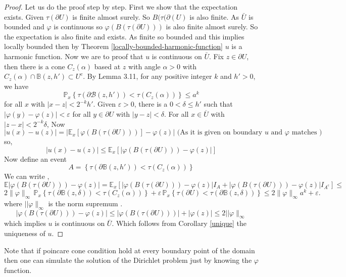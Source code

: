 \documentclass{article}
\numberwithin{equation}{section}
\begin{document}
\begin{proof}
Let us do the proof step by step. First we show that the expectation exists.
Given \(\tau(\partial U)\) is finite almost surely. So \(B(\tau(\partial(U)\) is also finite. As \(\bar{U}\) is bounded and \(\varphi\) is continuous so \(\varphi(B(\tau(\partial U)))\) is also finite almost surely. So the expectation is also finite and exists.
\noindent As finite so bounded and this implies locally bounded then by Theorem \ref{locally-bounded-harmonic-function} \(u\) is a harmonic function.
\noindent Now we are to proof that \(u\) is continuous on \(\bar{U}\). Fix \( z \in \partial U \), then there is a cone \( C_z(\alpha) \)
based at \( z \) with angle \( \alpha > 0 \) with \( C_z(\alpha) \cap \mathbb{B}(z, h') \subset U^c \). By Lemma 3.11, 
for any positive integer \( k \) and \( h' > 0 \), we have
\[
\mathbb{P}_x \left\{ \tau(\partial \mathcal{B}(z, h')) < \tau(C_z(\alpha)) \right\} \leq a^k
\]
for all \( x \) with \( |x - z| < 2^{-k} h' \). Given \( \varepsilon > 0 \), there is a \( 0 < \delta \leq h' \) such that 
\( |\varphi(y) - \varphi(z)| < \varepsilon \) for all \( y \in \partial U \) with \( |y - z| < \delta \). 
For all \( x \in \overline{U} \) with \( |z - x| < 2^{-k} \delta \),
Now \[
|u(x)-u(z)| = | \mathbb{E}_x[\varphi(B(\tau(\partial U)))]-\varphi(z)|
\text{ (As it is given on boundary \(u\) and \(\varphi\) matches )} 
\]
so,
\[
|u(x)-u(z)| \leq \mathbb{E}_x[|\varphi(B(\tau(\partial U)))-\varphi(z)|] 
\]
Now define an event \[A=\left\{ \tau(\partial \mathbb{B}(z, h')) < \tau(C_z(\alpha)) \right\}\]
We can write ,
\[
\mathbb{E}|\varphi(B(\tau(\partial U)))-\varphi(z)|=
\mathbb{E}_x[|\varphi(B(\tau(\partial U)))-\varphi(z)|I_A + |\varphi(B(\tau(\partial U)))-\varphi(z)|I_{A^c}] \leq 
\]
\[
2 \| \varphi \|_{\infty} \, \mathbb{P}_x \left\{ \tau(\partial \mathbb{B}(z, \delta)) < \tau(C_z(\alpha)) \right\} + 
\varepsilon \, \mathbb{P}_x \left\{ \tau(\partial U) < \tau(\partial \mathbb{B}(z, \delta)) \right\} 
\leq 2 \| \varphi \|_{\infty} a^k + \varepsilon.
\]
where \(||\varphi \|_{\infty}\) is the norm supremum .
\[
|\varphi(B(\tau(\partial U)))-\varphi(z)| \leq |\varphi(B(\tau(\partial U)))|+|\varphi(z)| \leq 2||\varphi \|_{\infty}
\]
which implies \(u \) is continuous on \(\bar{U}\). Which follows from Corollary \ref{unique} the uniqueness of \(u\).



\end{proof}
\noindent Note that if poincare cone condition hold at every boundary point of the domain then one can simulate the solution of the Dirichlet problem just by knowing the \(\varphi\) function.
\end{document}
